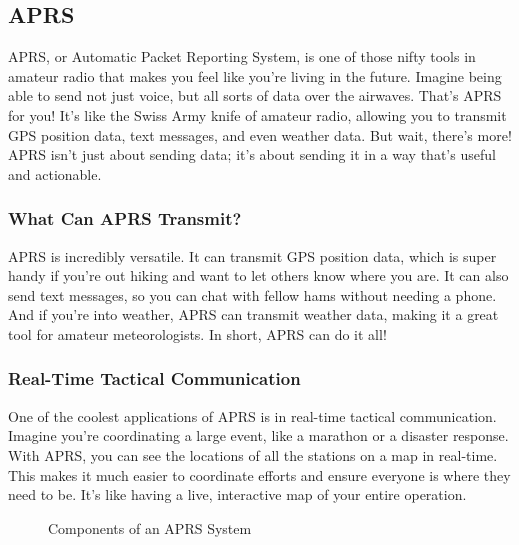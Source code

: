 \subsection{APRS}
\label{subsec:aprs2}

APRS, or Automatic Packet Reporting System, is one of those nifty tools in amateur radio that makes you feel like you're living in the future. Imagine being able to send not just voice, but all sorts of data over the airwaves. That's APRS for you! It's like the Swiss Army knife of amateur radio, allowing you to transmit GPS position data, text messages, and even weather data. But wait, there's more! APRS isn't just about sending data; it's about sending it in a way that's useful and actionable.

\subsubsection*{What Can APRS Transmit?}

APRS is incredibly versatile. It can transmit GPS position data, which is super handy if you're out hiking and want to let others know where you are. It can also send text messages, so you can chat with fellow hams without needing a phone. And if you're into weather, APRS can transmit weather data, making it a great tool for amateur meteorologists. In short, APRS can do it all!

\subsubsection*{Real-Time Tactical Communication}

One of the coolest applications of APRS is in real-time tactical communication. Imagine you're coordinating a large event, like a marathon or a disaster response. With APRS, you can see the locations of all the stations on a map in real-time. This makes it much easier to coordinate efforts and ensure everyone is where they need to be. It's like having a live, interactive map of your entire operation.

\begin{figure}[h]
    \centering
    \caption{Components of an APRS System}
    \label{fig:aprs-components}
\end{figure}

